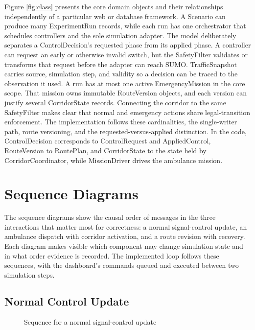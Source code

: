 Figure \ref{fig:class} presents the core domain objects and their relationships independently of a particular web or database framework. A Scenario can produce many ExperimentRun records, while each run has one orchestrator that schedules controllers and the sole simulation adapter. The model deliberately separates a ControlDecision's requested phase from its applied phase. A controller can request an early or otherwise invalid switch, but the SafetyFilter validates or transforms that request before the adapter can reach SUMO. TrafficSnapshot carries source, simulation step, and validity so a decision can be traced to the observation it used. A run has at most one active EmergencyMission in the core scope. That mission owns immutable RouteVersion objects, and each version can justify several CorridorState records. Connecting the corridor to the same SafetyFilter makes clear that normal and emergency actions share legal-transition enforcement. The implementation follows these cardinalities, the single-writer path, route versioning, and the requested-versus-applied distinction. In the code, ControlDecision corresponds to ControlRequest and AppliedControl, RouteVersion to RoutePlan, and CorridorState to the state held by CorridorCoordinator, while MissionDriver drives the ambulance mission.

\section{Sequence Diagrams}
\label{sec:sequences}

The sequence diagrams show the causal order of messages in the three interactions that matter most for correctness: a normal signal-control update, an ambulance dispatch with corridor activation, and a route revision with recovery. Each diagram makes visible which component may change simulation state and in what order evidence is recorded. The implemented loop follows these sequences, with the dashboard's commands queued and executed between two simulation steps.

\subsection{Normal Control Update}

\begin{figure}[htbp]
\centering
{}
\caption{Sequence for a normal signal-control update}
\label{fig:seq-normal}
\end{figure}

